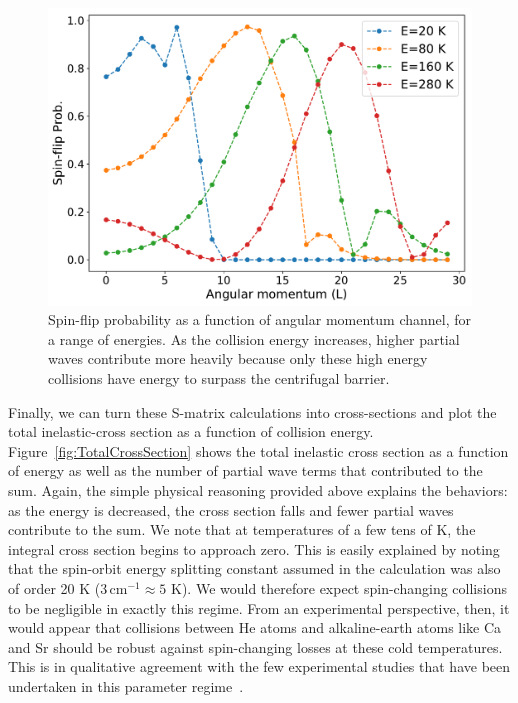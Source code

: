 \documentclass[%
 reprint,
 amsmath,amssymb,
 aps,
 nofootinbib
]{revtex4-1}
\begin{document}
\begin{figure}[b]
\includegraphics[width=1\columnwidth]{./Results/AtomAtomVersusL}
\caption{Spin-flip probability as a function of angular momentum channel, for a range of energies. As the collision energy increases, higher partial waves contribute more heavily because only these high energy collisions have energy to surpass the centrifugal barrier.}
\label{fig:AtomAtomVersusL}
\end{figure}

Finally, we can turn these S-matrix calculations into cross-sections and plot the total inelastic-cross section as a function of collision energy. Figure~\ref{fig:TotalCrossSection} shows the total inelastic cross section as a function of energy as well as the number of partial wave terms that contributed to the sum. Again, the simple physical reasoning provided above explains the behaviors: as the energy is decreased, the cross section falls and fewer partial waves contribute to the sum. We note that at temperatures of a few tens of K, the integral cross section begins to approach zero. This is easily explained by noting that the spin-orbit energy splitting constant assumed in the calculation was also of order 20 K ($3 \, \text{cm}^{-1} \approx 5 $ K). We would therefore expect spin-changing collisions to be negligible in exactly this regime. From an experimental perspective, then, it would appear that collisions between He atoms and alkaline-earth atoms like Ca and Sr should be robust against spin-changing losses at these cold temperatures. This is in qualitative agreement with the few experimental studies that have been undertaken in this parameter regime~\cite{Tscherbul2010,Connolly2013}.
\end{document}
